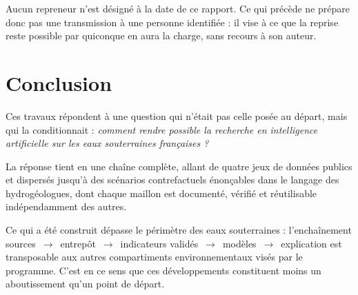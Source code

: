 Aucun repreneur n'est désigné à la date de ce rapport. Ce qui précède ne prépare donc pas une
transmission à une personne identifiée : il vise à ce que la reprise reste possible par
quiconque en aura la charge, sans recours à son auteur.

\section{Conclusion}

Ces travaux répondent à une question qui n'était pas celle posée au départ, mais qui la
conditionnait : \emph{comment rendre possible la recherche en intelligence artificielle sur les
eaux souterraines françaises ?}

La réponse tient en une chaîne complète, allant de quatre jeux de données publics et dispersés
jusqu'à des scénarios contrefactuels énonçables dans le langage des hydrogéologues, dont chaque
maillon est documenté, vérifié et réutilisable indépendamment des autres.

Ce qui a été construit dépasse le périmètre des eaux souterraines : l'enchaînement
sources~$\rightarrow$~entrepôt~$\rightarrow$~indicateurs validés~$\rightarrow$~modèles~$\rightarrow$~explication
est transposable aux autres compartiments environnementaux visés par le programme. C'est en ce
sens que ces développements constituent moins un aboutissement qu'un point de départ.

